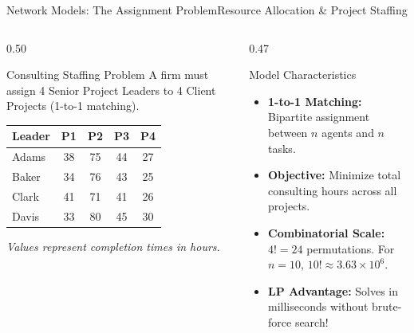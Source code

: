 \documentclass{beamer}
\begin{document}
\begin{frame}{Network Models: The Assignment Problem}{Resource Allocation \& Project Staffing}
\begin{columns}[T]
\begin{column}{0.50\textwidth}
\begin{block}{Consulting Staffing Problem}
A firm must assign 4 Senior Project Leaders to 4 Client Projects (1-to-1 matching).
\end{block}

\vspace{0.3em}
{\centering\footnotesize
\setlength{\tabcolsep}{4pt}
\begin{tabular}{lcccc}
\toprule
\textbf{Leader} & \textbf{P1} & \textbf{P2} & \textbf{P3} & \textbf{P4} \\
\midrule
Adams & 38 & 75 & 44 & 27 \\
Baker & 34 & 76 & 43 & 25 \\
Clark & 41 & 71 & 41 & 26 \\
Davis & 33 & 80 & 45 & 30 \\
\bottomrule
\end{tabular}\par}

\vspace{0.2em}
{\centering\scriptsize\textit{Values represent completion times in hours.}\par}
\end{column}

\begin{column}{0.47\textwidth}
\begin{block}{Model Characteristics}
\small
\begin{itemize}\setlength{\itemsep}{0.25em}
    \item \textbf{1-to-1 Matching:} Bipartite assignment between $n$ agents and $n$ tasks.
    \item \textbf{Objective:} Minimize total consulting hours across all projects.
    \item \textbf{Combinatorial Scale:}
    $4! = 24$ permutations. For $n=10$, $10! \approx 3.63 \times 10^6$.
    \item \textbf{LP Advantage:} Solves in milliseconds without brute-force search!
\end{itemize}
\end{block}
\end{column}
\end{columns}
\end{frame}
\end{document}
